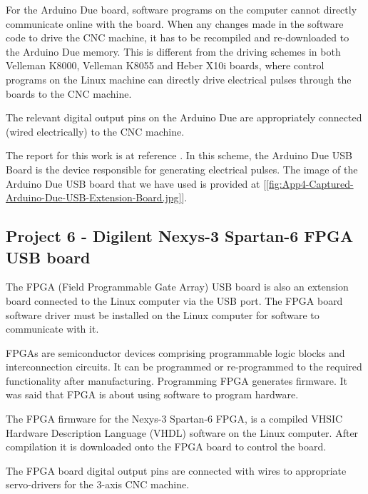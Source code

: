 For the Arduino Due board, software programs on the computer cannot directly communicate online with the board. When any changes made in the software code to drive the CNC machine, it has to be recompiled and re-downloaded to the Arduino Due memory. This is different from the driving schemes in both Velleman K8000, Velleman K8055 and Heber X10i boards, where control programs on the Linux machine can directly drive electrical pulses through the boards to the CNC machine. 
\vspace*{1\baselineskip}

The relevant digital output pins on the Arduino Due are appropriately connected (wired electrically) to the CNC machine. 
\vspace*{1\baselineskip}

The report for this work is at reference \cite{FYP_Hazmi_2014}. In this scheme, the Arduino Due USB Board is the device responsible for generating electrical pulses. The image of the  Arduino Due USB board that we have used is provided at [\ref{fig:App4-Captured-Arduino-Due-USB-Extension-Board.jpg}].

\subsection{Project 6 - Digilent Nexys-3 Spartan-6 FPGA USB board}

The FPGA (Field Programmable Gate Array) USB board is also an extension board connected to the Linux computer via the USB port. The FPGA board software driver must be installed on the Linux computer for software to communicate with it.
\vspace*{1\baselineskip}

FPGAs are semiconductor devices comprising programmable logic blocks and interconnection circuits. It can be programmed or re-programmed to the required functionality after manufacturing. Programming FPGA generates firmware. It was said that FPGA is about using software to program hardware.
\vspace*{1\baselineskip}

The FPGA firmware for the Nexys-3 Spartan-6 FPGA, is a compiled VHSIC Hardware Description Language (VHDL) software on the Linux computer. After compilation it is downloaded onto the FPGA board to control the board. 
\vspace*{1\baselineskip}

The FPGA board digital output pins are connected with wires to appropriate servo-drivers for the 3-axis CNC machine. 
\vspace*{1\baselineskip}

